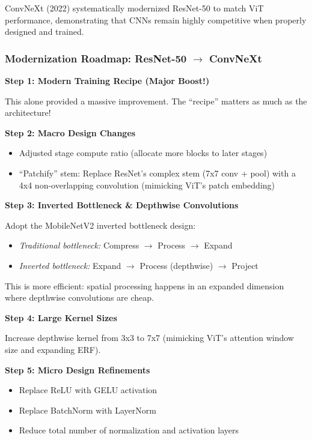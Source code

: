 \documentclass{article}
\begin{document}
ConvNeXt (2022) systematically modernized ResNet-50 to match ViT performance, demonstrating that CNNs remain highly competitive when properly designed and trained.

\subsubsection{Modernization Roadmap: ResNet-50 $\rightarrow$ ConvNeXt}

\textbf{Step 1: Modern Training Recipe (Major Boost!)}

This alone provided a massive improvement. The ``recipe'' matters as much as the architecture!

\textbf{Step 2: Macro Design Changes}
\begin{itemize}
    \item Adjusted stage compute ratio (allocate more blocks to later stages)
    \item ``Patchify'' stem: Replace ResNet's complex stem (7x7 conv + pool) with a 4x4 non-overlapping convolution (mimicking ViT's patch embedding)
\end{itemize}

\textbf{Step 3: Inverted Bottleneck \& Depthwise Convolutions}

Adopt the MobileNetV2 inverted bottleneck design:
\begin{itemize}
    \item \textit{Traditional bottleneck:} Compress $\rightarrow$ Process $\rightarrow$ Expand
    \item \textit{Inverted bottleneck:} Expand $\rightarrow$ Process (depthwise) $\rightarrow$ Project
\end{itemize}

This is more efficient: spatial processing happens in an expanded dimension where depthwise convolutions are cheap.

\textbf{Step 4: Large Kernel Sizes}

Increase depthwise kernel from 3x3 to 7x7 (mimicking ViT's attention window size and expanding ERF).

\textbf{Step 5: Micro Design Refinements}
\begin{itemize}
    \item Replace ReLU with GELU activation
    \item Replace BatchNorm with LayerNorm
    \item Reduce total number of normalization and activation layers
\end{itemize}
\end{document}
